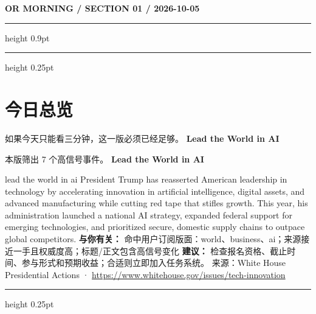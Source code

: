 \documentclass[10.5pt]{ctexart}
\begin{document}
{\small\bfseries OR MORNING / SECTION 01 / 2026-10-05}
\vspace{2mm}
\hrule height 0.9pt
\vspace{1.5mm}
\hrule height 0.25pt
\vspace{4mm}
\section*{今日总览}
{\color{ormuted} 如果今天只能看三分钟，这一版必须已经足够。}
\vspace{2mm}
{\fontsize{25}{29}\selectfont\bfseries Lead the World in AI}\par
\vspace{2mm}
{\large 本版筛出 7 个高信号事件。}
\vspace{3mm}
{\Large\bfseries Lead the World in AI}\par
lead the world in ai President Trump has reasserted American leadership in technology by accelerating innovation in artificial intelligence, digital assets, and advanced manufacturing while cutting red tape that stifles growth. This year, his administration launched a national AI strategy, expanded federal support for emerging technologies, and prioritized secure, domestic supply chains to outpace global competitors.
\textbf{与你有关：} 命中用户订阅版面：world、business、ai；来源接近一手且权威度高；标题/正文包含高信号变化
\textbf{建议：} 检查报名资格、截止时间、参与形式和预期收益；合适则立即加入任务系统。
{\footnotesize\color{ormuted} 来源：White House Presidential Actions · \url{https://www.whitehouse.gov/issues/tech-innovation}}
\vspace{3mm}
\hrule height 0.25pt
\vspace{3mm}
\end{document}
